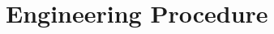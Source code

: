 \documentclass[11pt
  , a4paper
  , article
  , oneside
  , showtrims
]{memoir}
\begin{document}


\chapter{Engineering Procedure}

  
         
  
\end{document}
